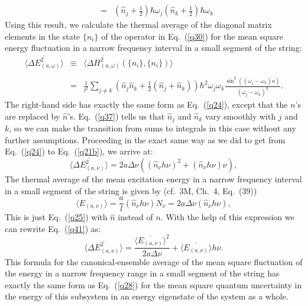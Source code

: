 \documentclass[12pt]{elsart}
\begin{document}
{\begin{eqnarray}
 & & \label{q38} \\
  & = & \left( \hat{n}_j + \frac{1}{2} \right) \hbar \omega_j
\left( \hat{n}_k + \frac{1}{2} \right) \hbar \omega_k \nonumber
\end{eqnarray}
Using this result, we calculate the thermal average of the diagonal matrix elements in the state $\{ n_i \}$ of the operator in Eq.\ (\ref{q30}) for the mean square energy fluctuation in a narrow frequency interval in a small segment of the string:
\begin{eqnarray}
\langle \overline{\Delta E_{(a, \omega)}^2} \rangle  & \equiv & \langle \overline{\Delta H_{(a, \omega)}^2} (\{ n_i \}, \{ n_i \}) \rangle \nonumber \\
& & \label{q39} \\ 
 & = & \frac{1}{l^2}  \sum_{j \neq k} \left(  \hat{n}_{j}\hat{n}_{k}+\frac{1}{2} \left( \hat{n}_{j}+\hat{n}_{k} \right)
 \right) \hbar^{2}\omega_{j}\omega_{k}  \frac{\sin^2{((\omega_j - \omega_k)a)}}{(\omega_j - \omega_k)^2}.  \nonumber
\end{eqnarray}
The right-hand side has exactly the same form as Eq.\ (\ref{q24}), except that the $n$'s are replaced by $\hat{n}$'s. Eq.\ (\ref{q37}) tells us that $\hat{n}_j$ and $\hat{n}_k$ vary smoothly with $j$ and $k$, so we can make the transition from sums to integrals in this case without any further assumptions. Proceeding in the exact same way as we did to get from Eq.\ (\ref{q24}) to Eq.\ (\ref{q21b}), we arrive at:
 \begin{equation}
\langle \overline{\Delta E_{(a, \nu)}^2} \rangle = 2 a \Delta \nu  \left( (\hat{n}_\nu h \nu)^2 + ( \hat{n}_\nu h \nu) \nu \right),
\label{q41}
\end{equation}
The thermal average of the mean excitation energy in a narrow frequency interval in a small segment of the string is given by (cf.\ 3M, Ch.\ 4, Eq.\ (39))
\begin{equation}
\langle \overline{E_{(a, \nu)} } \rangle = \frac{a}{l} \left( \hat{n}_\nu h \nu \right) N_\nu = 2 a \Delta \nu \left( \hat{n}_\nu h \nu \right),
\label{q42}
\end{equation}
This is just Eq.\ (\ref{q25}) with $\hat{n}$ instead of $n$.  With the help of this expression we can rewrite Eq.\ (\ref{q41}) as:
\begin{equation}
\langle \overline{\Delta E_{(a, \nu)}^2} \rangle =
\frac{ \langle \overline{ E_{(a, \nu)}} \rangle^2}{2a\Delta \nu} +\langle  \overline{E_{(a, \nu)}} \rangle h \nu.
\label{q43}
\end{equation}
This formula for the canonical-ensemble average of
the mean square fluctuation of the energy in a narrow frequency range in a small segment of the string has exactly the same form as Eq.\ (\ref{q28}) for the mean square quantum uncertainty in the energy of this subsystem in an energy eigenstate of the system as a whole. 

}
\end{document}
